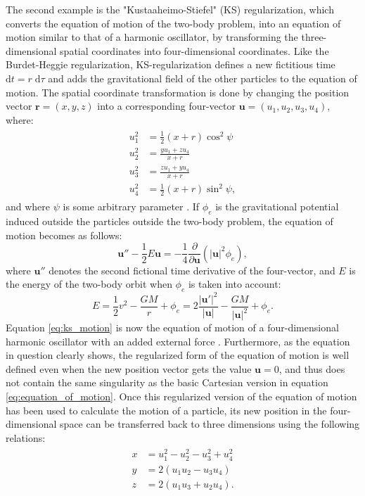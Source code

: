 \documentclass[english, oneside]{HYgradu}
\begin{document}
The second example is the "Kustaaheimo-Stiefel" (KS) regularization, which converts the equation of motion of the two-body problem, into an equation of motion similar to that of a harmonic oscillator, by transforming the three-dimensional spatial coordinates into four-dimensional coordinates. Like the Burdet-Heggie regularization, KS-regularization defines a new fictitious time $\mathrm{d}t = r \; \mathrm{d}\tau$ and adds the gravitational field of the other particles to the equation of motion. The spatial coordinate transformation is done by changing the position vector $\mathbf{r} = (x, y, z)$ into a corresponding four-vector $\mathbf{u} = (u_1, u_2, u_3, u_4)$, where:
\begin{align}
\begin{split}
u_1^2& = \frac{1}{2}(x+r)\cos^2\psi \\
u_2^2& = \frac{yu_1+zu_4}{x+r} \\
u_3^2& = \frac{zu_1+yu_4}{x+r} \\
u_4^2& = \frac{1}{2}(x+r)\sin^2\psi,
\end{split}
\end{align}
and where $\psi$ is some arbitrary parameter \citep{BinneyTremaine}. If $\phi_e$ is the gravitational potential induced outside the particles outside the two-body problem, the equation of motion becomes as follows:
\begin{equation}
\mathbf{u}'' - \frac{1}{2} E \mathbf{u} = -\frac{1}{4} \frac{\partial}{\partial\mathbf{u}} \left( |\mathbf{u}|^2 \phi_e \right), \label{eq:ks_motion}
\end{equation} 
where $\mathbf{u}''$ denotes the second fictional time derivative of the four-vector, and $E$ is the energy of the two-body orbit when $\phi_e$ is taken into account:
\begin{equation}
E = \frac{1}{2}v^2 - \frac{GM}{r} + \phi_e = 2 \frac{|\mathbf{u'}|^2}{|\mathbf{u}|} - \frac{GM}{|\mathbf{u}|^2} + \phi_e.
\end{equation}
Equation \ref{eq:ks_motion} is now the equation of motion of a four-dimensional harmonic oscillator with an added external force \citep{BinneyTremaine}. Furthermore, as the equation in question clearly shows, the regularized form of the equation of motion is well defined even when the new position vector gets the value $\mathbf{u} = 0$, and thus does not contain the same singularity as the basic Cartesian version in equation \ref{eq:equation_of_motion}. Once this regularized version of the equation of motion has been used to calculate the motion of a particle, its new position in the four-dimensional space can be transferred back to three dimensions using the following relations:
\begin{align}
\begin{split}
x &= u_1^2 - u_2^2 - u_3^2 + u_4^2 \\
y &= 2 \left( u_1 u_2 - u_3 u_4 \right) \\
z &= 2 \left( u_1 u_3 + u_2 u_4 \right).
\end{split}
\end{align}
\end{document}
